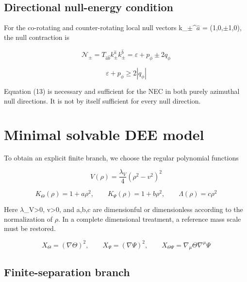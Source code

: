 \documentclass[aps,prd,preprint,nofootinbib,superscriptaddress]{revtex4-2}
\begin{document}
\subsection{Directional null-energy condition}

For the co-rotating and counter-rotating local null vectors k\_$\pm$\textasciicircum{}$\hat a$ = (1,0,$\pm$1,0), the null contraction is


\begin{equation}
\mathcal N_\pm=T_{\hat a\hat b}k_\pm^{\hat a}k_\pm^{\hat b}=\varepsilon+p_\phi\pm2q_\phi
\tag{12}\label{eq:12}
\end{equation}

\begin{equation}
\varepsilon+p_\phi\geq2|q_\phi|
\tag{13}\label{eq:13}
\end{equation}

Equation (13) is necessary and sufficient for the NEC in both purely azimuthal null directions. It is not by itself sufficient for every null direction.


\section{Minimal solvable DEE model}

To obtain an explicit finite branch, we choose the regular polynomial functions


\begin{equation}
V(\rho)=\frac{\lambda_V}{4}(\rho^2-v^2)^2
\tag{14}\label{eq:14}
\end{equation}

\begin{equation}
K_\Theta(\rho)=1+a\rho^2,\qquad K_\Psi(\rho)=1+b\rho^2,\qquad \Lambda(\rho)=c\rho^2
\tag{15}\label{eq:15}
\end{equation}

Here $\lambda$\_V>0, v>0, and a,b,c are dimensionful or dimensionless according to the normalization of $\rho$. In a complete dimensional treatment, a reference mass scale must be restored.


\begin{equation}
X_\Theta=(\nabla\Theta)^2,\qquad X_\Psi=(\nabla\Psi)^2,\qquad X_{\Theta\Psi}=\nabla_\mu\Theta\nabla^\mu\Psi
\tag{16}\label{eq:16}
\end{equation}

\subsection{Finite-separation branch}
\end{document}
